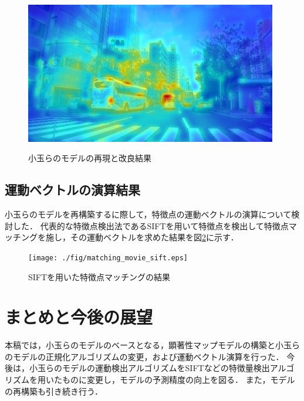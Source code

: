 \begin{figure}[h]
\begin{minipage}[h]{0.5\hsize}
      \label{fig:kodama_before}
    \end{minipage}
    \begin{minipage}[h]{0.5\hsize}
      \centering
      \vspace{-3.2mm}
      \includegraphics[width=0.98\textwidth]{./fig/101_after.eps}
      \label{fig:kodama_after}
    \end{minipage}
    \vspace*{0.8mm}
    \caption{小玉らのモデルの再現と改良結果}
    \label{fig:kodama_saliency}
\end{figure}

\subsection{運動ベクトルの演算結果}
小玉らのモデルを再構築するに際して，特徴点の運動ベクトルの演算について検討した．
代表的な特徴点検出法であるSIFT\cite{sift}を用いて特徴点を検出して特徴点マッチングを施し，その運動ベクトルを求めた結果を図\ref{fig:sift}に示す．

\vspace{-1.5mm}

\begin{figure}[h]
  \centering
  \texttt{[image: ./fig/matching\_movie\_sift.eps]}
  \centering
  \vspace{0.5mm}
  \caption{SIFTを用いた特徴点マッチングの結果}
  \label{fig:sift}
\end{figure}

\vspace{-3.5mm}

\section{まとめと今後の展望}
\vspace{-2.0mm}
本稿では，小玉らのモデルのベースとなる，顕著性マップモデルの構築と小玉らのモデルの正規化アルゴリズムの変更，および運動ベクトル演算を行った．
今後は，小玉らのモデルの運動検出アルゴリズムをSIFTなどの特徴量検出アルゴリズムを用いたものに変更し，モデルの予測精度の向上を図る．
また，モデルの再構築も引き続き行う．

